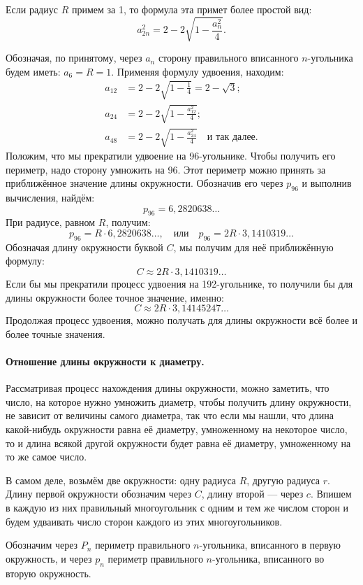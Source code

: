 \documentclass[twoside]{book}
\begin{document}
Если радиус $R$ примем за 1, то формула эта примет более простой вид:
\[a_{2n}^2=2-2\sqrt{1-\frac{a_n^2}4}.\]


Обозначая, по принятому, через $a_n$ сторону правильного вписанного $n$-угольника будем иметь:
$a_6=R=1$.
Применяя формулу удвоения, находим:
\begin{align*}
a_{12}&=2-2\sqrt{1-\tfrac14}=2-\sqrt3;
\\
a_{24}&=2-2\sqrt{1-\tfrac{a_{12}^2}{4}};
\\
a_{48}&=2-2\sqrt{1-\tfrac{a_{24}^2}{4}}\quad\text{и так далее.}
\end{align*}
Положим, что мы прекратили удвоение на 96-угольнике.
Чтобы получить его периметр, надо сторону умножить на 96.
Этот периметр можно принять за приближённое значение длины окружности.
Обозначив его через $p_{96}$ и выполнив вычисления, найдём:
\[p_{96} = 6{,}2820638\dots\]
При радиусе, равном $R$, получим:
\[p_{96}=R\cdot6{,}2820638\dots,
\quad\text{или}\quad
p_{96}=2R\cdot3{,}1410319\dots\]
Обозначая длину окружности буквой $C$, мы получим для неё приближённую формулу:
\[C\approx 2R\cdot3{,}1410319\dots\]
Если бы мы прекратили процесс удвоения на 192-угольнике, то получили бы для длины окружности более точное значение, именно:
\[C\approx2R\cdot3{,}14145247\dots\]
Продолжая процесс удвоения, можно получать для длины окружности всё более и более точные значения.

\paragraph{Отношение длины окружности к диаметру.}\label{1938/238}
Рассматривая процесс нахождения длины окружности, можно заметить, что число, на которое нужно умножить диаметр, чтобы получить длину окружности, не зависит от величины самого диаметра, так что если мы нашли, что длина какой-нибудь окружности равна её диаметру, умноженному на некоторое число, то и длина всякой другой окружности будет равна её диаметру, умноженному на то же самое число.

В самом деле, возьмём две окружности:
одну радиуса $R$, другую радиуса $r$.
Длину первой окружности обозначим через $C$, длину второй — через $c$.
Впишем в каждую из них правильный многоугольник с одним и тем же числом сторон и будем удваивать число сторон каждого из этих многоугольников.

Обозначим через $P_n$ периметр правильного $n$-угольника, вписанного в первую окружность, и через $p_n$ периметр правильного $n$-угольника, вписанного во вторую окружность.
\end{document}
